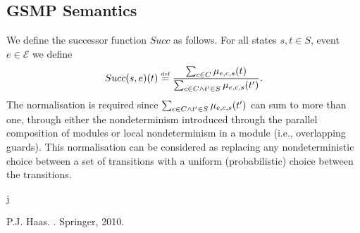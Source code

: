 \documentclass{article}
\newcommand{\eqdef}{\ensuremath{\stackrel{\text{\tiny def}}{=}}}
\renewcommand{\_}{\underline{~}}
\newcommand{\suc}{Succ}
\begin{document}
\subsection*{GSMP Semantics}
We define the successor function $\suc$ as follows.
For all states $s,t\in S$, event $e \in \mathcal{E}$ we define
\[\suc(s,e)(t) \eqdef \frac{\sum_{c \in C} \mu_{e,c,s}(t)}{\sum_{c \in C \\ \wedge t'\in S} \mu_{e,c,s}(t')}. \]
The normalisation is required since $\sum_{c \in C \\ \wedge t'\in S} \mu_{e,c,s}(t')$ can sum to more than one, through either the nondeterminism introduced through the parallel composition of modules or local nondeterminism in a module (i.e., overlapping guards). 
This normalisation can be considered as replacing any nondeterministic choice between a set of transitions with a uniform (probabilistic) choice between the transitions.



%
%
j%
%
%
%


\begin{thebibliography}{1}
P.J. Haas.
.
\newblock Springer, 2010.
\end{thebibliography}
\end{document}
